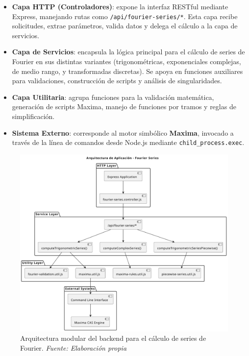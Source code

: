 \begin{itemize}
	\item \textbf{Capa HTTP (Controladores)}: expone la interfaz RESTful mediante Express, manejando rutas como \texttt{/api/fourier-series/*}. Esta capa recibe solicitudes, extrae parámetros, valida datos y delega el cálculo a la capa de servicios.
	
	\item \textbf{Capa de Servicios}: encapsula la lógica principal para el cálculo de series de Fourier en sus distintas variantes (trigonométricas, exponenciales complejas, de medio rango, y transformadas discretas). Se apoya en funciones auxiliares para validaciones, construcción de scripts y análisis de singularidades.
	
	\item \textbf{Capa Utilitaria}: agrupa funciones para la validación matemática, generación de scripts Maxima, manejo de funciones por tramos y reglas de simplificación.
	
	\item \textbf{Sistema Externo}: corresponde al motor simbólico \textbf{Maxima}, invocado a través de la línea de comandos desde Node.js mediante \texttt{child\_process.exec}.
\end{itemize}

\begin{figure}[H]
	\centering
	\includegraphics[width=1\textwidth]{img/chapter07/arqui-apliacion.pdf}
	\caption[Arquitectura modular del backend para el cálculo de series de Fourier.]{Arquitectura modular del backend para el cálculo de series de Fourier. \textit{Fuente: \textit{Elaboración propia}}}
	\label{fig:backend-architecture}
\end{figure}

